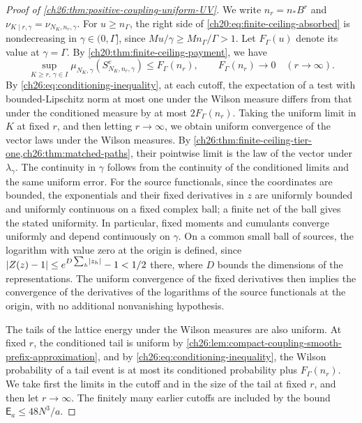 \begin{proof}[Proof of \cref{ch26:thm:positive-coupling-uniform-UV}]
We write $n_r=n_*B^r$ and $\nu_{K\mid r,\gamma}=\nu_{N_K,n_r,\gamma}$. For $u\ge n_\Gamma$, the right side of \eqref{ch20:eq:finite-ceiling-absorbed} is nondecreasing in $\gamma\in(0,\Gamma]$, since $Mu/\gamma\ge Mn_\Gamma/\Gamma>1$. Let $F_\Gamma(u)$ denote its value at $\gamma=\Gamma$. By \cref{ch20:thm:finite-ceiling-payment}, we have
\[
 \sup_{K\ge r,\,\gamma\in I}\mu_{N_K,\gamma}(S^c_{N_K,n_r,\gamma})\le F_\Gamma(n_r),\qquad F_\Gamma(n_r)\longrightarrow0\quad(r\to\infty).
\]
By \eqref{ch26:eq:conditioning-inequality}, at each cutoff, the expectation of a test with bounded-Lipschitz norm at most one under the Wilson measure differs from that under the conditioned measure by at most $2F_\Gamma(n_r)$. Taking the uniform limit in $K$ at fixed $r$, and then letting $r\to\infty$, we obtain uniform convergence of the vector laws under the Wilson measures. By \cref{ch26:thm:finite-ceiling-tier-one,ch26:thm:matched-paths}, their pointwise limit is the law of the vector under $\lambda_\gamma$. The continuity in $\gamma$ follows from the continuity of the conditioned limits and the same uniform error. For the source functionals, since the coordinates are bounded, the exponentials and their fixed derivatives in $z$ are uniformly bounded and uniformly continuous on a fixed complex ball; a finite net of the ball gives the stated uniformity. In particular, fixed moments and cumulants converge uniformly and depend continuously on $\gamma$. On a common small ball of sources, the logarithm with value zero at the origin is defined, since $\lvert Z(z)-1\rvert\le e^{D\sum_h\lvert z_h\rvert}-1<1/2$ there, where $D$ bounds the dimensions of the representations. The uniform convergence of the fixed derivatives then implies the convergence of the derivatives of the logarithms of the source functionals at the origin, with no additional nonvanishing hypothesis.

The tails of the lattice energy under the Wilson measures are also uniform. At fixed $r$, the conditioned tail is uniform by \cref{ch26:lem:compact-coupling-smooth-prefix-approximation}, and by \eqref{ch26:eq:conditioning-inequality}, the Wilson probability of a tail event is at most its conditioned probability plus $F_\Gamma(n_r)$. We take first the limits in the cutoff and in the size of the tail at fixed $r$, and then let $r\to\infty$. The finitely many earlier cutoffs are included by the bound $\mathsf E_a\le48N^3/a$.


\end{proof}
